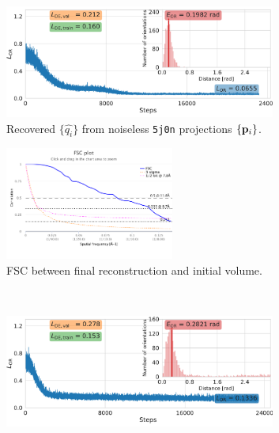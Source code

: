 \begin{figure}[t]
    \centering
    \begin{subfigure}[b]{0.56\linewidth}
        \centering
        \includegraphics[height=10em]{figures/5j0n_ar_aa_fullcvg_uniform2}
        \caption{Recovered $\{ \widehat{q_i} \}$ from noiseless \texttt{5j0n} projections $\{ \mathbf{p}_i \}$.
        }%
        \label{fig:5j0n-noise0-orientation-recovery}
    \end{subfigure}
    \hfill
    \begin{subfigure}[b]{0.4\linewidth}
        \centering  
        \includegraphics[height=10em]{figures/FSC_5j0n_fullcvg_uniformS2_noise0_fin_vs_init.pdf}
        \caption{FSC between final reconstruction and initial volume.}%
        \label{fig:5j0n-noise0-reconstruction-recovered}
    \end{subfigure}
    \\ \vspace{1em}
    \begin{subfigure}[b]{0.56\linewidth}
        \centering
        \includegraphics[height=10em]{figures/5j0n_fullcov_noise16_ar_aa}

\end{subfigure}
\end{figure}
